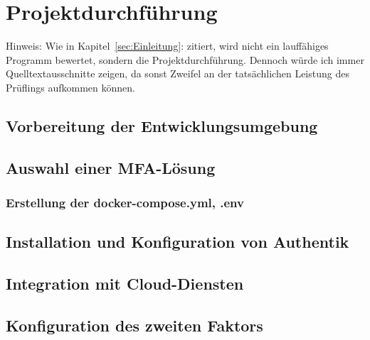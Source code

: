 \section{Projektdurchführung} 
\label{sec:Projektdurchführung}

Hinweis: Wie in Kapitel~\ref{sec:Einleitung}:  zitiert, 
wird nicht ein lauffähiges Programm bewertet, sondern die Projektdurchführung. 
Dennoch würde ich immer Quelltextausschnitte zeigen, da sonst Zweifel an der 
tatsächlichen Leistung des Prüflings aufkommen können.

\subsection{Vorbereitung der Entwicklungsumgebung}
\label{Vorbereitung der Entwicklungsumgebung}

\subsection{Auswahl einer MFA-Lösung}
\label{Auswahl einer MFA-Lösung}

\subsubsection{Erstellung der docker-compose.yml, .env}
\label{Erstellung der docker-compose.yml, .env}


\subsection{Installation und Konfiguration von Authentik}
\label{Installation und Konfiguration von Authentik}

\subsection{Integration mit Cloud-Diensten}
\label{Integration mit Cloud-Diensten}

\subsection{Konfiguration des zweiten Faktors}
\label{Konfiguration des zweiten Faktors}